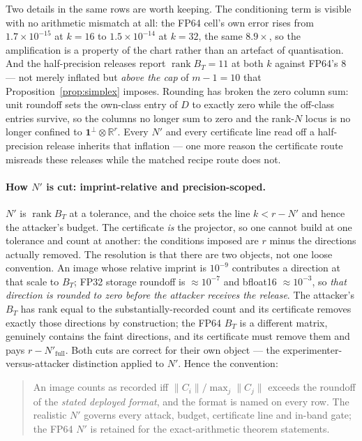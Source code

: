 Two details in the same rows are worth keeping. The conditioning term is
visible with no arithmetic mismatch at all: the FP64 cell's own error rises
from $1.7\times10^{-15}$ at $k=16$ to $1.5\times10^{-14}$ at $k=32$, the same
$8.9\times$, so the amplification is a property of the chart rather than an
artefact of quantisation. And the half-precision releases report
$\operatorname{rank}B_T=11$ at both $k$ against FP64's $8$ --- not merely
inflated but \emph{above the cap} of $m-1=10$ that
Proposition~\ref{prop:simplex} imposes. Rounding has broken the zero column
sum: unit roundoff sets the own-class entry of $D$ to exactly zero while the
off-class entries survive, so the columns no longer sum to zero and the
rank-$N$ locus is no longer confined to $\mathbf 1^{\perp}\otimes\mathbb R^r$.
Every $N'$ and every certificate line read off a half-precision release
inherits that inflation --- one more reason the certificate route misreads
these releases while the matched recipe route does not.

\paragraph{How $N'$ is cut: imprint-relative and precision-scoped.} $N'$ is
$\operatorname{rank}B_T$ at a tolerance, and the choice sets the line
$k<r-N'$ and hence the attacker's budget. The certificate \emph{is} the
projector, so one cannot build at one tolerance and count at another: the
conditions imposed are $r$ minus the directions actually removed. The
resolution is that there are two objects, not one loose convention. An image
whose relative imprint is $10^{-9}$ contributes a direction at that scale to
$B_T$; FP32 storage roundoff is $\approx10^{-7}$ and bfloat16
$\approx10^{-3}$, so \emph{that direction is rounded to zero before the
attacker receives the release}. The attacker's $B_T$ has rank equal to the
substantially-recorded count and its certificate removes exactly those
directions by construction; the FP64 $B_T$ is a different matrix, genuinely
contains the faint directions, and its certificate must remove them and pays
$r-N'_{\text{full}}$. Both cuts are correct for their own object --- the
experimenter-versus-attacker distinction applied to $N'$. Hence the
convention:

\begin{quote}
An image counts as recorded iff $\|C_i\|/\max_j\|C_j\|$ exceeds the roundoff
of the \emph{stated deployed format}, and the format is named on every row.
The realistic $N'$ governs every attack, budget, certificate line and in-band
gate; the FP64 $N'$ is retained for the exact-arithmetic theorem statements.
\end{quote}

